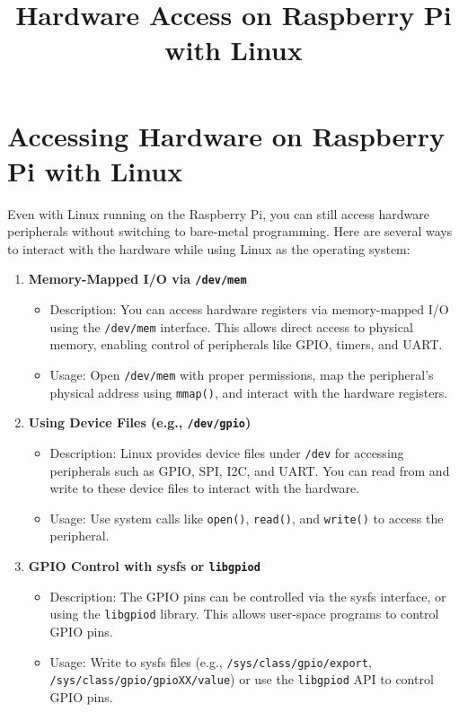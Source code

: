 \documentclass{article}
\title{Hardware Access on Raspberry Pi with Linux}
\author{}
\date{}
\begin{document}
\maketitle

\section{Accessing Hardware on Raspberry Pi with Linux}

Even with Linux running on the Raspberry Pi, you can still access hardware peripherals without switching to bare-metal programming. Here are several ways to interact with the hardware while using Linux as the operating system:

\begin{enumerate}
    \item \textbf{Memory-Mapped I/O via \texttt{/dev/mem}}
    \begin{itemize}
        \item Description: You can access hardware registers via memory-mapped I/O using the \texttt{/dev/mem} interface. This allows direct access to physical memory, enabling control of peripherals like GPIO, timers, and UART.
        \item Usage: Open \texttt{/dev/mem} with proper permissions, map the peripheral's physical address using \texttt{mmap()}, and interact with the hardware registers.
    \end{itemize}

    \item \textbf{Using Device Files (e.g., \texttt{/dev/gpio})}
    \begin{itemize}
        \item Description: Linux provides device files under \texttt{/dev} for accessing peripherals such as GPIO, SPI, I2C, and UART. You can read from and write to these device files to interact with the hardware.
        \item Usage: Use system calls like \texttt{open()}, \texttt{read()}, and \texttt{write()} to access the peripheral.
    \end{itemize}

    \item \textbf{GPIO Control with sysfs or \texttt{libgpiod}}
    \begin{itemize}
        \item Description: The GPIO pins can be controlled via the sysfs interface, or using the \texttt{libgpiod} library. This allows user-space programs to control GPIO pins.
        \item Usage: Write to sysfs files (e.g., \texttt{/sys/class/gpio/export}, \texttt{/sys/class/gpio/gpioXX/value}) or use the \texttt{libgpiod} API to control GPIO pins.
    \end{itemize}


\end{enumerate}
\end{document}
